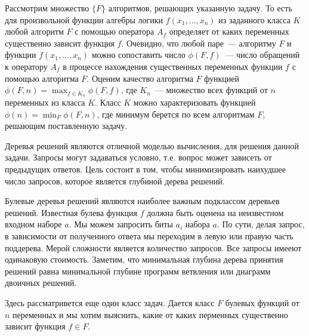 \documentclass[oneside, final, 14pt]{extreport}
\begin{document}
	 Рассмотрим множество $\{F\}$ алгоритмов, решающих указанную задачу. То есть для произвольной функции алгебры логики $f(x_1, \ldots, x_n)$
	 из заданного класса $K$  любой алгоритм $F$ с помощью оператора $A_f$ определяет от каких переменных существенно зависит функция $f$.
	 Очевидно, что любой паре~--- алгоритму $F$ и функции $f(x_1, \ldots, x_n)$ можно сопоставить число $\phi(F,f)$~--- число обращений 
	 к оператору $A_f$ в процессе нахождения существенных переменных функции $f$ с помощью алгоритма $F$.  
	 Оценим качество алгоритма $F$ функцией $\phi(F,n) = \max_{f \in K_n}\phi(F, f)$, где $K_n$~--- множество всех функций от $n$ переменных из класса $K$.
	 Класс $K$ можно характеризовать функцией $\phi(n) = \min_F\phi(F, n)$, где минимум берется по всем алгоритмам $F$, решающим поставленную задачу.
	
	Деревья решений являются отличной  моделью вычисления, для решения данной задачи. Запросы могут задаваться условно, т.е. вопрос может зависеть от предыдущих 
	ответов. Цель состоит в том, чтобы минимизировать наихудшее число запросов, которое является глубиной дерева решений.
	
	Булевые деревья  решений являются наиболее важным подклассом деревьев решений. Известная булева функция $f$ должна быть оценена
	на неизвестном входном наборе $a$. Мы можем запросить биты $a_i$ набора $a$. 	
	По сути, делая запрос, в зависимости от полученного ответа мы переходим в левую или правую часть поддерева. 
	Мерой сложности является количество запросов. Все запросы имееют одинаковую стоимость. Заметим, что минимальная глубина дерева принятия
	решений равна минимальной глубине программ ветвления или диаграмм двоичных решений.\cite{wegener}
	
	Здесь рассматривется еще один класс задач. Дается класс $F$ булевых функций от $n$ переменных и мы хотим выяснить, какие от каких 
	перменных существенно зависит функция $f \in F$.
	
\end{document}
